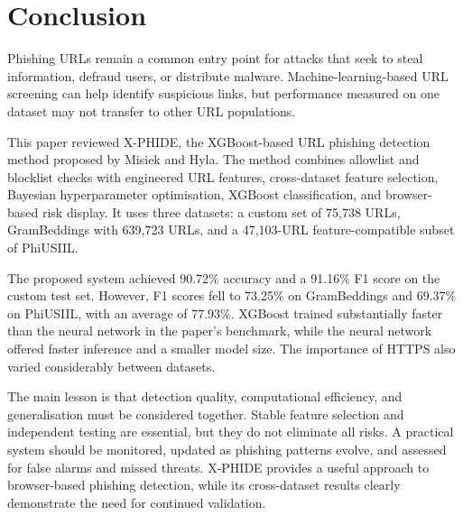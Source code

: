 \chapter{Conclusion}
\setcounter{equation}{0}
Phishing URLs remain a common entry point for attacks that seek to steal information, defraud users, or distribute malware. Machine-learning-based URL screening can help identify suspicious links, but performance measured on one dataset may not transfer to other URL populations.

This paper reviewed X-PHIDE, the XGBoost-based URL phishing detection method proposed by Misiek and Hyla. The method combines allowlist and blocklist checks with engineered URL features, cross-dataset feature selection, Bayesian hyperparameter optimisation, XGBoost classification, and browser-based risk display. It uses three datasets: a custom set of 75,738 URLs, GramBeddings with 639,723 URLs, and a 47,103-URL feature-compatible subset of PhiUSIIL.\cite{bib1}

The proposed system achieved 90.72\% accuracy and a 91.16\% F1 score on the custom test set. However, F1 scores fell to 73.25\% on GramBeddings and 69.37\% on PhiUSIIL, with an average of 77.93\%. XGBoost trained substantially faster than the neural network in the paper's benchmark, while the neural network offered faster inference and a smaller model size. The importance of HTTPS also varied considerably between datasets.

The main lesson is that detection quality, computational efficiency, and generalisation must be considered together. Stable feature selection and independent testing are essential, but they do not eliminate all risks. A practical system should be monitored, updated as phishing patterns evolve, and assessed for false alarms and missed threats. X-PHIDE provides a useful approach to browser-based phishing detection, while its cross-dataset results clearly demonstrate the need for continued validation.\cite{bib1}
